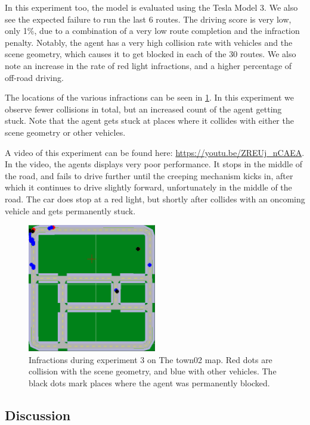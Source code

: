 In this experiment too, the model is evaluated using the Tesla Model 3.
We also see the expected failure to run the last 6 routes.
The driving score is very low, only 1\%,
due to a combination of a very low route completion and the infraction penalty.
Notably, the agent has a very high collision rate with vehicles and the scene geometry,
which causes it to get blocked in each of the 30 routes.
We also note an increase in the rate of red light infractions,
and a higher percentage of off-road driving.

The locations of the various infractions can be seen in \cref{fig:exp3:town02}.
In this experiment we observe fewer collisions in total,
but an increased count of the agent getting stuck.
Note that the agent gets stuck at places where it collides with either the scene geometry or other vehicles.

A video of this experiment can be found here: \url{https://youtu.be/ZREUj_nCAEA}.
In the video, the agents displays very poor performance.
It stops in the middle of the road,
and fails to drive further until the creeping mechanism kicks in,
after which it continues to drive slightly forward,
unfortunately in the middle of the road.
The car does stop at a red light,
but shortly after collides with an oncoming vehicle and gets permanently stuck.

\begin{figure}
    \centering
    \includegraphics[width=0.5\textwidth]{figures/results/exp3-town02.png}
    \caption{Infractions during experiment 3 on The town02 map.
    Red dots are collision with the scene geometry,
    and blue with other vehicles.
    The black dots mark places where the agent was permanently blocked.}
    \label{fig:exp3:town02}
\end{figure}


\subsection{Discussion}

